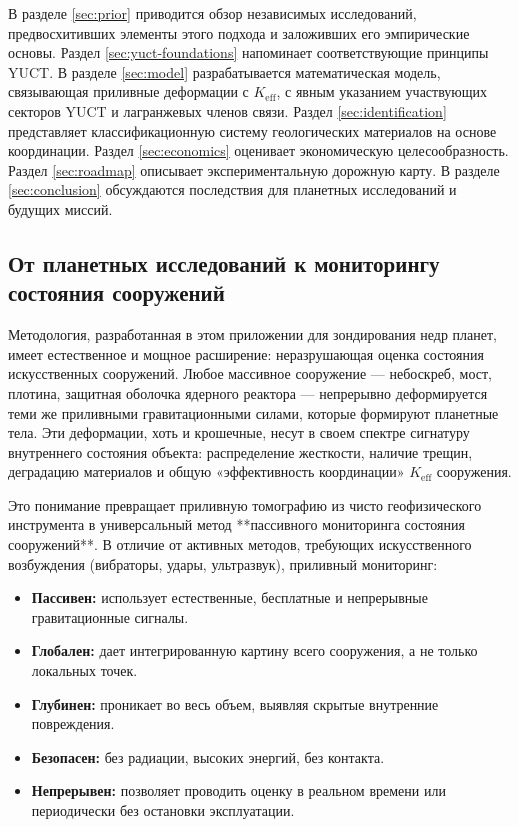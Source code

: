 \documentclass[12pt,a4paper]{article}
\theoremstyle{remark}
\newcommand{\Keff}{K_{\mathrm{eff}}}
\begin{document}
	В разделе \ref{sec:prior} приводится обзор независимых исследований, предвосхитивших элементы этого подхода и заложивших его эмпирические основы. Раздел \ref{sec:yuct-foundations} напоминает соответствующие принципы YUCT. В разделе \ref{sec:model} разрабатывается математическая модель, связывающая приливные деформации с $\Keff$, с явным указанием участвующих секторов YUCT и лагранжевых членов связи. Раздел \ref{sec:identification} представляет классификационную систему геологических материалов на основе координации. Раздел \ref{sec:economics} оценивает экономическую целесообразность. Раздел \ref{sec:roadmap} описывает экспериментальную дорожную карту. В разделе \ref{sec:conclusion} обсуждаются последствия для планетных исследований и будущих миссий.
	
	\subsection{От планетных исследований к мониторингу состояния сооружений}
	\label{sec:beyond-geophysics}
	
	Методология, разработанная в этом приложении для зондирования недр планет, имеет естественное и мощное расширение: неразрушающая оценка состояния искусственных сооружений. Любое массивное сооружение — небоскреб, мост, плотина, защитная оболочка ядерного реактора — непрерывно деформируется теми же приливными гравитационными силами, которые формируют планетные тела. Эти деформации, хоть и крошечные, несут в своем спектре сигнатуру внутреннего состояния объекта: распределение жесткости, наличие трещин, деградацию материалов и общую «эффективность координации» \(K_{\mathrm{eff}}\) сооружения.
	
	Это понимание превращает приливную томографию из чисто геофизического инструмента в универсальный метод **пассивного мониторинга состояния сооружений**. В отличие от активных методов, требующих искусственного возбуждения (вибраторы, удары, ультразвук), приливный мониторинг:
	\begin{itemize}
		\item \textbf{Пассивен:} использует естественные, бесплатные и непрерывные гравитационные сигналы.
		\item \textbf{Глобален:} дает интегрированную картину всего сооружения, а не только локальных точек.
		\item \textbf{Глубинен:} проникает во весь объем, выявляя скрытые внутренние повреждения.
		\item \textbf{Безопасен:} без радиации, высоких энергий, без контакта.
		\item \textbf{Непрерывен:} позволяет проводить оценку в реальном времени или периодически без остановки эксплуатации.
	\end{itemize}
	
\end{document}

